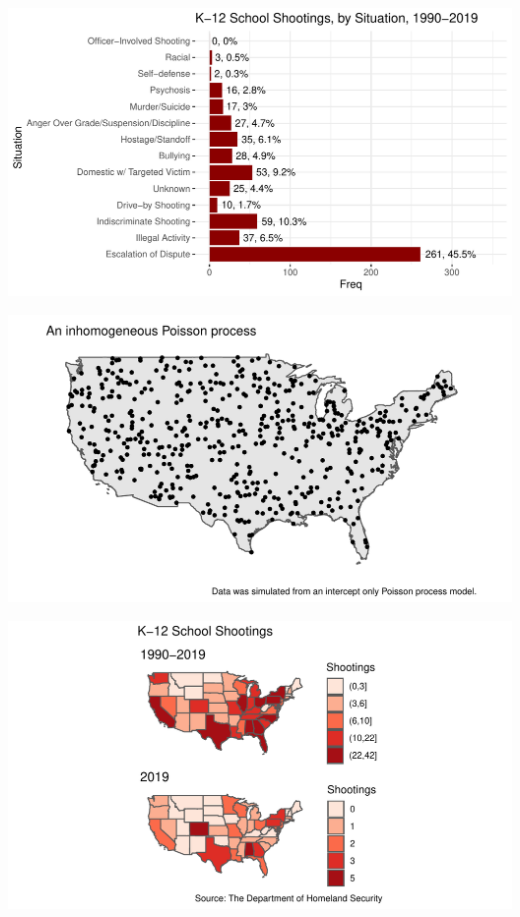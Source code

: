 \documentclass[
  12pt,
]{article}
\begin{document}
\includegraphics{JStevenRaquel_STATS295_Final_files/figure-latex/plot-situation-1.pdf}

\includegraphics[height=0.75\textheight]{JStevenRaquel_STATS295_Final_files/figure-latex/plot-simulate-ppm-1}

\includegraphics{JStevenRaquel_STATS295_Final_files/figure-latex/plot-areal-events-1.pdf}
\end{document}

